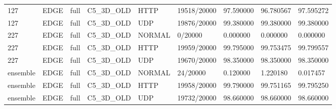 \begin{tabular}{lllllllll}
127 & EDGE & full & C5\_3D\_OLD & HTTP & 19518/20000 & 97.590000 & 96.780567 & 97.595272 \\
127 & EDGE & full & C5\_3D\_OLD & UDP & 19876/20000 & 99.380000 & 99.380000 & 99.380000 \\
227 & EDGE & full & C5\_3D\_OLD & NORMAL & 0/20000 & 0.000000 & 0.000000 & 0.000000 \\
227 & EDGE & full & C5\_3D\_OLD & HTTP & 19959/20000 & 99.795000 & 99.753475 & 99.799557 \\
227 & EDGE & full & C5\_3D\_OLD & UDP & 19670/20000 & 98.350000 & 98.350000 & 98.350000 \\
ensemble & EDGE & full & C5\_3D\_OLD & NORMAL & 24/20000 & 0.120000 & 1.220180 & 0.017457 \\
ensemble & EDGE & full & C5\_3D\_OLD & HTTP & 19958/20000 & 99.790000 & 99.751165 & 99.795250 \\
ensemble & EDGE & full & C5\_3D\_OLD & UDP & 19732/20000 & 98.660000 & 98.660000 & 98.660000 \\
\hline
\end{tabular}
